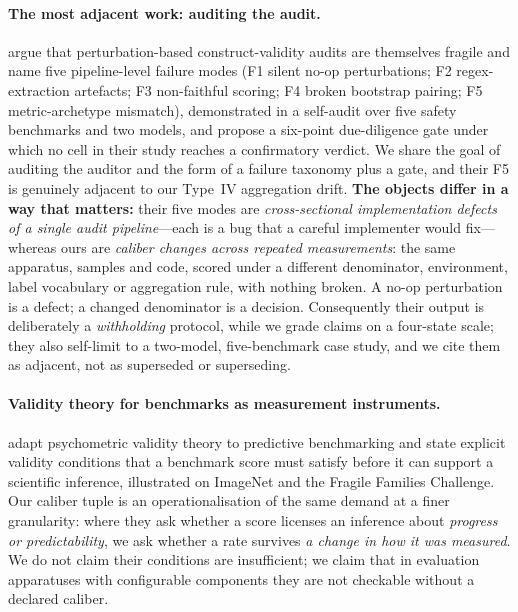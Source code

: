\documentclass{article}
\begin{document}
\paragraph{The most adjacent work: auditing the audit.} \citet{li2026auditingaudit} argue that
perturbation-based construct-validity audits are themselves fragile and name five pipeline-level
failure modes (F1 silent no-op perturbations; F2 regex-extraction artefacts; F3 non-faithful scoring;
F4 broken bootstrap pairing; F5 metric-archetype mismatch), demonstrated in a self-audit over five
safety benchmarks and two models, and propose a six-point due-diligence gate under which no cell in
their study reaches a confirmatory verdict. We share the goal of auditing the auditor and the form of
a failure taxonomy plus a gate, and their F5 is genuinely adjacent to our Type~IV aggregation drift.
\textbf{The objects differ in a way that matters:} their five modes are
\emph{cross-sectional implementation defects of a single audit pipeline}---each is a bug that a careful
implementer would fix---whereas ours are \emph{caliber changes across repeated measurements}: the same
apparatus, samples and code, scored under a different denominator, environment, label
vocabulary or aggregation rule, with nothing broken. A no-op perturbation is a defect; a changed
denominator is a decision. Consequently their output is deliberately a \emph{withholding} protocol,
while we grade claims on a four-state scale; they also self-limit to a two-model, five-benchmark case
study, and we cite them as adjacent, not as superseded or superseding.

\paragraph{Validity theory for benchmarks as measurement instruments.} \citet{freiesleben2026benchmarkingepistemology}
adapt psychometric validity theory to predictive benchmarking and state explicit validity conditions
that a benchmark score must satisfy before it can support a scientific inference, illustrated on
ImageNet and the Fragile Families Challenge. Our caliber tuple is an operationalisation of the same
demand at a finer granularity: where they ask whether a score licenses an inference about \emph{progress
or predictability}, we ask whether a rate survives \emph{a change in how it was measured}. We do not
claim their conditions are insufficient; we claim that in evaluation apparatuses with configurable
components they are not checkable without a declared caliber.
\end{document}
